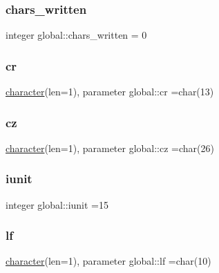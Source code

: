 \mbox{\label{namespaceglobal_a22f0db93abbbbd8c37f50b829daa00ad}} 
\subsubsection{\texorpdfstring{chars\+\_\+written}{chars\_written}}
{\footnotesize\ttfamily integer global\+::chars\+\_\+written = 0}

\mbox{\label{namespaceglobal_a66654a3eb0e9c862da1f7ca5388b2e83}} 
\subsubsection{\texorpdfstring{cr}{cr}}
{\footnotesize\ttfamily \hyperlink{option__stopwatch_83_8txt_abd4b21fbbd175834027b5224bfe97e66}{character}(len=1), parameter global\+::cr =char(13)}

\mbox{\label{namespaceglobal_ae55226f82ca7ee1f12eeb19f4619f98c}} 
\subsubsection{\texorpdfstring{cz}{cz}}
{\footnotesize\ttfamily \hyperlink{option__stopwatch_83_8txt_abd4b21fbbd175834027b5224bfe97e66}{character}(len=1), parameter global\+::cz =char(26)}

\mbox{\label{namespaceglobal_ad88d280367759e82acb4de429dce1caa}} 
\subsubsection{\texorpdfstring{iunit}{iunit}}
{\footnotesize\ttfamily integer global\+::iunit =15}

\mbox{\label{namespaceglobal_a65a09148e3924472bdd8a5735476c7ed}} 
\subsubsection{\texorpdfstring{lf}{lf}}
{\footnotesize\ttfamily \hyperlink{option__stopwatch_83_8txt_abd4b21fbbd175834027b5224bfe97e66}{character}(len=1), parameter global\+::lf =char(10)}


